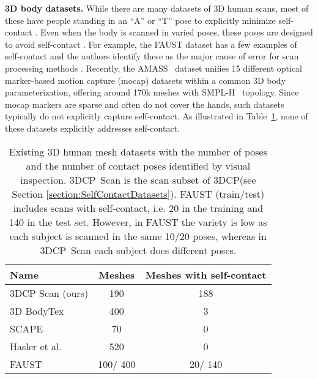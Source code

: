 \documentclass[final]{cvpr}
\renewcommand{\etal}{et al.\xspace}
\renewcommand{\ie}{i.e.\xspace}
\newcommand{\threedcp}{\mbox{3DCP}\xspace}
\newcommand{\threedcpscan}{\mbox{3DCP Scan}\xspace}
\theoremstyle{definition}
\begin{document}
{\bf 3D body datasets.}
While there are many datasets of 3D human scans, most of these have people standing in an ``A''  or ``T'' pose to explicitly minimize self-contact \cite{Robinette1999TheCP}.
Even when the body is scanned in varied poses, these poses are  designed to avoid self-contact
\cite{Anguelov2005scape,dfaust:CVPR:2017,bronstein2008numerical,Dyna:SIGGRAPH:2015}.
For example, the FAUST dataset has a few examples of self-contact and the authors identify these as the major cause of error for scan processing methods \cite{Bogo:CVPR:2014}. 
Recently, the AMASS~\cite{AMASS:2019} dataset unifies 15 different optical marker-based motion capture (mocap) datasets within a common 3D body parameterization, offering around 170k meshes with SMPL-H~\cite{MANO:SIGGRAPHASIA:2017} topology. 
Since mocap markers are sparse and often do not cover the hands, such datasets typically do not explicitly capture self-contact.
As illustrated in Table~\ref{tab:contactinexistingdatasets}, none of these datasets explicitly addresses self-contact.

\begin{table}
	\begin{center}
		\begin{tabular}{lcc}
			\hline
			Name       & Meshes &   Meshes with self-contact    \\
			\hline
			3DCP Scan (ours) & 190       &    188  \\ \hline
			3D BodyTex \cite{ahmed2018survey} & 400        &    3     \\
			SCAPE \cite{Anguelov2005scape}     & 70              &    0    \\
			Hasler \etal \cite{hasler2009statistical} & 	520      &    0     \\
			FAUST  \cite{Bogo:CVPR:2014}    & 100/ 400            &     20/ 140   \\
			\hline
		\end{tabular}
	    \caption{Existing 3D  human mesh datasets with the number of poses and the number of contact poses identified by visual inspection. 
	    \threedcpscan is the scan subset of \threedcp (see Section \ref{section:SelfContactDatasets}). 
	    FAUST (train/test) includes scans with self-contact, \ie 20 in the training and 140 in the test set. 
	    However, in FAUST the variety is low as each subject is scanned in the same 10/20 poses, whereas in \threedcpscan each subject does different poses.
	    }
	    \label{tab:contactinexistingdatasets}
    \end{center}
\end{table}
\end{document}
